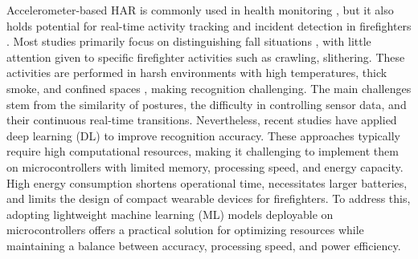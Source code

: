 \documentclass[journal,twoside,web]{ieeecolor}
\begin{document}
Accelerometer-based HAR is commonly used in health monitoring \cite{HumanActivityRecognition2022,Wang2018,MobiFall_Yi_2024, HAR_DCT_deeplearning2023, Fall_Elder2019, Fall_Elder2022, Elder_Falling_2019, SFDLAdataset2016}, but it also holds potential for real-time activity tracking and incident detection in firefighters \cite{Xu_fire2020,wearableFirefirefighter2015,wearableFirefirefighter2018}. Most studies primarily focus on distinguishing fall situations \cite{ Chai2021,CHAI_FIRE2024, Thanhfire2019, Rosengren_FIRE2014}, with little attention given to specific firefighter activities \cite{Chai2021,CHAI_FIRE2024} such as crawling, slithering. These activities are performed in harsh environments with high temperatures, thick smoke, and confined spaces \cite{Shah2024}, making recognition challenging. The main challenges stem from the similarity of postures, the difficulty in controlling sensor data, and their continuous real-time transitions. Nevertheless, recent studies have applied deep learning (DL) \cite{HAR_DCT_deeplearning2023,CHAI_FIRE2024,DL2021_HAR_wearable,HAR_DL_sensor2023} to improve recognition accuracy. These approaches typically require high computational resources, making it challenging to implement them on microcontrollers with limited memory, processing speed, and energy capacity. High energy consumption shortens operational time, necessitates larger batteries, and limits the design of compact wearable devices for firefighters. To address this, adopting lightweight machine learning (ML) models deployable on microcontrollers offers a practical solution for optimizing resources while maintaining a balance between accuracy, processing speed, and power efficiency. 
\end{document}
